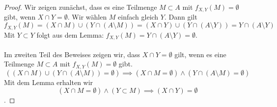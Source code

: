 \documentclass{article}
\begin{document}
\begin{proof}
	Wir zeigen zunächst, dass es eine Teilmenge $M \subset A$ mit $f_{X,Y}(M) = \emptyset$ gibt, wenn $X\cap Y = \emptyset$.
	Wir wählen $M$ einfach gleich $Y$. Dann gilt \[f_{X,Y}(M) = (X \cap M ) \cup (Y \cap (A \setminus M)) =  (X \cap Y) \cup (Y \cap (A \setminus Y)) = Y \cap (A \setminus Y)\]Mit $Y\subset Y$ folgt aus dem Lemma: $f_{X,Y}(M) = Y \cap (A \setminus Y) = \emptyset$.\\\ \\
	Im zweiten Teil des Beweises zeigen wir, dass $X\cap Y = \emptyset$ gilt, wenn es eine Teilmenge $M \subset A$ mit $f_{X,Y}(M) = \emptyset$ gibt.\\
	\[((X \cap M ) \cup (Y \cap (A \setminus M)) = \emptyset) \implies (X \cap M = \emptyset) \land (Y \cap (A \setminus M) = \emptyset)\]
	Mit dem Lemma erhalten wir \[(X \cap M = \emptyset) \land (Y\subset M) \implies (X \cap Y) = \emptyset\].
\end{proof}
\newpage
\end{document}

